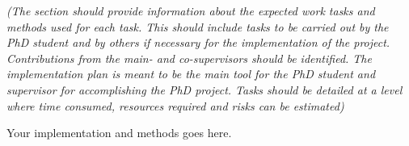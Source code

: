 %
%
\textit{(The section should provide information about the expected work tasks and methods used for each task. This should include tasks to be carried out by the PhD student and by others if necessary for the implementation of the project. Contributions from the main- and co-supervisors should be identified. The implementation plan is meant to be the main tool for the PhD student and supervisor for accomplishing the PhD project. Tasks should be detailed at a level where time consumed, resources required and risks can be estimated)}
\vspace{1cm}

Your implementation and methods goes here. 